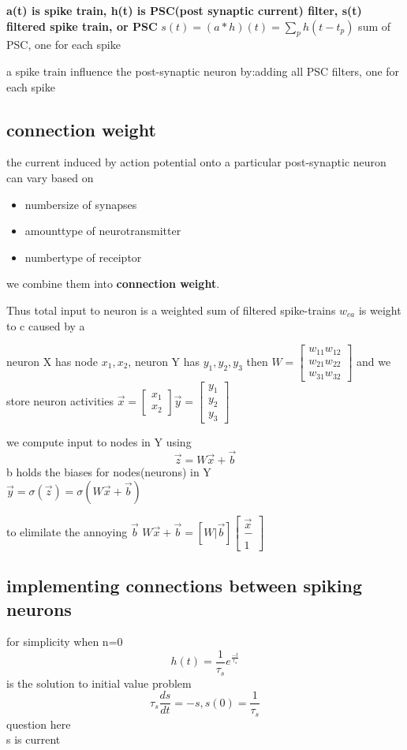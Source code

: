\documentclass[10pt]{article}
\theoremstyle{break}
\begin{document}
\textbf{a(t) is spike train, h(t) is PSC(post synaptic current) filter, s(t) filtered spike train, or PSC}
$s(t)=(a*h)(t)=\sum_ph(t-t_p)$ sum of PSC, one for each spike

a spike train influence the post-synaptic neuron by:adding all PSC filters, one for each spike

\subsection{connection weight}
the current induced by action potential onto a particular post-synaptic neuron can vary based on 
\begin{itemize}
    \item number\/size of synapses 
    \item amount\/type of neurotransmitter 
    \item number\/type of receiptor
\end{itemize}
we combine them into \textbf{connection weight}.

Thus total input to neuron is a weighted sum of filtered spike-trains
$w_{ca}$ is weight to c caused by a

neuron X has node $x_1, x_2$, neuron Y has $y_1, y_2, y_3$
then $W=\begin{bmatrix}
    w_{11} w_{12}\\w_{21} w_{22}\\w_{31} w_{32}
\end{bmatrix}$
and we store neuron activities $\vec{x}= \begin{bmatrix}x_1\\x_2\end{bmatrix} \vec{y}=\begin{bmatrix}
    y_1\\y_2\\y_3
\end{bmatrix}$

we compute input to nodes in Y using $$\vec{z}=W\vec{x}+\vec{b}$$
b holds the biases for nodes(neurons) in Y
\\$\vec{y}=\sigma(\vec{z})=\sigma(W\vec{x}+\vec{b})$

to elimilate the annoying $\vec{b}$
$W\vec{x}+\vec{b}=[W|\vec{b}]\begin{bmatrix}
    \vec{x}\\-\\1
\end{bmatrix}$

\subsection{implementing connections between spiking neurons}
for simplicity when n=0
$$h(t)=\frac{1}{\tau_s}e^{\frac{-t}{\tau_s}}$$ is the solution to initial value problem 
$$\tau_s\frac{ds}{dt}=-s, s(0)=\frac{1}{\tau_s}$$
question here\\
s is current
\end{document}
